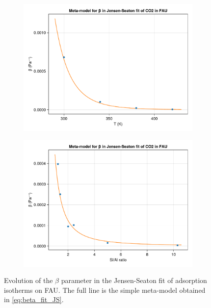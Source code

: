 \documentclass[main.tex]{subfiles}
\begin{document}
\begin{figure}
	\begin{subfigure}{0.49\columnwidth}
		\includegraphics[width=\columnwidth]{figures/isotherms/evolution_beta_temperature.pdf}
		\label{subfig:beta_temperature}
	\end{subfigure}\hfill%
	\begin{subfigure}{0.49\columnwidth}
		\includegraphics[width=\columnwidth]{figures/isotherms/evolution_beta_ratio.pdf}
		\label{subfig:beta_ratio}
	\end{subfigure}
	\caption{Evolution of the $\beta$ parameter in the Jensen-Seaton fit of  adsorption isotherms on FAU. The full line is the simple meta-model obtained in \cref{eq:beta_fit_JS}.}\label{fig:beta_evolution}
\end{figure}
\end{document}
